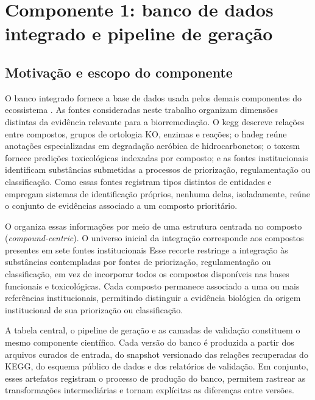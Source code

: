 
\chapter{Componente 1: banco de dados integrado e pipeline de geração}
\label{cap:comp1}

\section{Motivação e escopo do componente}
\label{sec:c1-motivacao}

O banco integrado fornece a base de dados usada pelos demais componentes do ecossistema \biorempp{}. As fontes consideradas neste trabalho organizam dimensões distintas da evidência relevante para a biorremediação. O \gls{kegg} descreve relações entre compostos, grupos de ortologia KO, enzimas e reações; o \gls{hadeg} reúne anotações especializadas em degradação aeróbica de hidrocarbonetos; o \gls{toxcsm} fornece predições toxicológicas indexadas por composto; e as fontes institucionais identificam substâncias submetidas a processos de priorização, regulamentação ou classificação. Como essas fontes registram tipos distintos de entidades e empregam sistemas de
identificação próprios, nenhuma delas, isoladamente, reúne o conjunto de
evidências associado a um composto prioritário.

O \biorempp{} organiza essas informações por meio de uma estrutura centrada no composto (\textit{compound-centric}). O universo inicial da integração corresponde aos compostos presentes em sete fontes institucionais Esse recorte restringe a integração às substâncias contempladas por fontes de priorização, regulamentação ou classificação, em vez de incorporar todos os compostos disponíveis nas bases funcionais e toxicológicas. Cada composto permanece associado a uma ou mais referências institucionais, permitindo distinguir a evidência biológica da origem institucional de sua priorização ou classificação.

A tabela central, o pipeline de geração e as camadas de validação constituem o mesmo componente científico. Cada versão do banco é produzida a partir dos arquivos curados de entrada, do snapshot versionado das relações recuperadas do KEGG, do esquema público de dados e dos relatórios de validação. Em conjunto, esses artefatos registram o processo de produção do banco, permitem rastrear as transformações intermediárias e tornam explícitas as diferenças entre versões.

